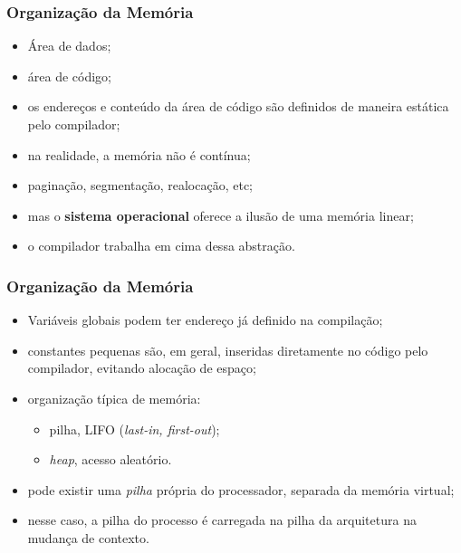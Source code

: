 \documentclass[table]{beamer}
\begin{document}
\begin{frame}
   \frametitle{Organização da Memória}
   \begin{itemize}
      \item Área de dados;
      \item área de código;
      \item os endereços e conteúdo da área de código são definidos de maneira estática pelo compilador;
      \item na realidade, a memória não é contínua;
      \item paginação, segmentação, realocação, etc;
      \item mas o \textbf{sistema operacional} oferece a ilusão de uma memória linear;
      \item o compilador trabalha em cima dessa abstração.
   \end{itemize}
\end{frame}

\begin{frame}
   \frametitle{Organização da Memória}
   \begin{itemize}
      \item Variáveis globais podem ter endereço já definido na compilação;
      \item constantes pequenas são, em geral, inseridas diretamente no código pelo compilador, evitando alocação de espaço;
      \item organização típica de memória:
      \begin{itemize}
         \item pilha, LIFO (\textit{last-in, first-out});
	 \item \textit{heap}, acesso aleatório.
      \end{itemize}
      \item pode existir uma \textit{pilha} própria do processador, separada da memória virtual;
      \item nesse caso, a pilha do processo é carregada na pilha da arquitetura na mudança de contexto.
   \end{itemize}
\end{frame}
\end{document}
